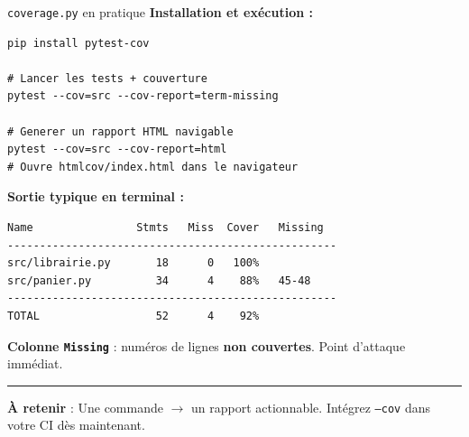 \documentclass[aspectratio=169,11pt]{beamer}
\newcommand{\takeaway}[1]{%
\vfill\begin{beamercolorbox}[wd=\linewidth,sep=0.4em]{}
\color{accent2}\rule[0.6ex]{1.2em}{1.2pt}\hspace{0.4em}%
\textbf{\color{accent2}\small À retenir} \textcolor{textsoft}{:} %
{\small\color{textmain}#1}
\end{beamercolorbox}}
\begin{document}
\begin{frame}[fragile,t,shrink=10]{\texttt{coverage.py} en pratique}
\footnotesize
\textbf{Installation et exécution :}
\begin{lstlisting}[style=bashdark]
pip install pytest-cov

# Lancer les tests + couverture
pytest --cov=src --cov-report=term-missing

# Generer un rapport HTML navigable
pytest --cov=src --cov-report=html
# Ouvre htmlcov/index.html dans le navigateur
\end{lstlisting}
\vspace{0.3cm}
\textbf{Sortie typique en terminal :}
\begin{lstlisting}[style=bashdark]
Name                Stmts   Miss  Cover   Missing
---------------------------------------------------
src/librairie.py       18      0   100%
src/panier.py          34      4    88%   45-48
---------------------------------------------------
TOTAL                  52      4    92%
\end{lstlisting}
\vspace{0.3cm}
\textbf{Colonne \texttt{Missing}} : numéros de lignes \textbf{non couvertes}. Point d'attaque immédiat.
\takeaway{Une commande $\to$ un rapport actionnable. Intégrez \texttt{--cov} dans votre CI dès maintenant.}
\end{frame}
\end{document}
